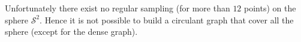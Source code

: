 \documentclass{article} %
\newcommand{\figref}[1]{Figure~\ref{fig:#1}}
\newcommand{\secref}[1]{Section~\ref{sec:#1}}
\newcommand{\eqnref}[1]{(\ref{eqn:#1})}
\renewcommand{\b}[1]{{\bm{#1}}}   %
\newcommand{\1}{\b{1}}              %
\newcommand{\0}{\b{0}}              %
\renewcommand{\L}{\b{L}}
\newcommand{\T}{\mathcal{T}}
\begin{document}
Unfortunately there exist no regular sampling (for more than $12$ points) on the sphere $\mathcal{S}^2$. Hence it is not possible to build a circulant graph that cover all the sphere (except for the dense graph).









\end{document}
